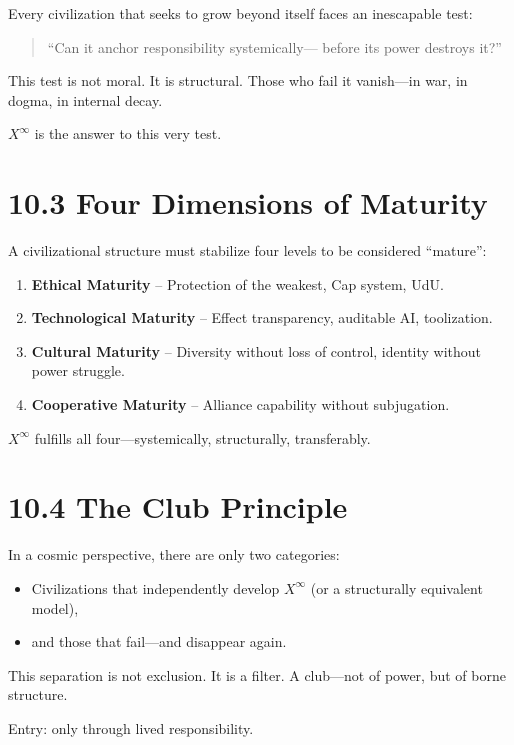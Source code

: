 \documentclass[12pt,a4paper]{book}
\begin{document}
Every civilization that seeks to grow beyond itself  
faces an inescapable test:

\begin{quote}
“Can it anchor responsibility systemically—  
before its power destroys it?”  
\end{quote}

This test is not moral. It is structural.  
Those who fail it vanish—in war, in dogma, in internal decay.

$X^\infty$ is the answer to this very test.

\section*{10.3 Four Dimensions of Maturity}

A civilizational structure must stabilize four levels  
to be considered “mature”:

\begin{enumerate}
    \item \textbf{Ethical Maturity} – Protection of the weakest, Cap system, UdU.
    \item \textbf{Technological Maturity} – Effect transparency, auditable AI, toolization.
    \item \textbf{Cultural Maturity} – Diversity without loss of control, identity without power struggle.
    \item \textbf{Cooperative Maturity} – Alliance capability without subjugation.
\end{enumerate}

$X^\infty$ fulfills all four—systemically, structurally, transferably.

\section*{10.4 The Club Principle}

In a cosmic perspective, there are only two categories:

\begin{itemize}
    \item Civilizations that independently develop $X^\infty$ (or a structurally equivalent model),
    \item and those that fail—and disappear again.
\end{itemize}

This separation is not exclusion.  
It is a filter.  
A club—not of power, but of borne structure.

Entry: only through lived responsibility.
\end{document}

